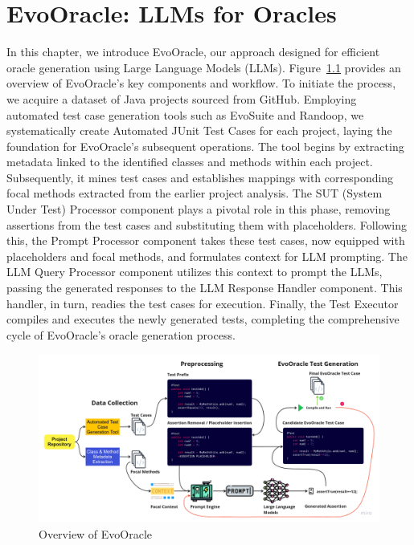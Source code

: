 \chapter{EvoOracle: LLMs for Oracles}
\label{cha:evoOracles}
\vspace{0.4 cm}

In this chapter, we introduce EvoOracle, our approach designed for efficient oracle generation using Large Language Models (LLMs). Figure~\ref{fig:evooracle_overview} provides an overview of EvoOracle's key components and workflow. To initiate the process, we acquire a dataset of Java projects sourced from GitHub. Employing automated test case generation tools such as EvoSuite and Randoop, we systematically create Automated JUnit Test Cases for each project, laying the foundation for EvoOracle's subsequent operations. The tool begins by extracting metadata linked to the identified classes and methods within each project. Subsequently, it mines test cases and establishes mappings with corresponding focal methods extracted from the earlier project analysis. The SUT (System Under Test) Processor component plays a pivotal role in this phase, removing assertions from the test cases and substituting them with placeholders. Following this, the Prompt Processor component takes these test cases, now equipped with placeholders and focal methods, and formulates context for LLM prompting. The LLM Query Processor component utilizes this context to prompt the LLMs, passing the generated responses to the LLM Response Handler component. This handler, in turn, readies the test cases for execution. Finally, the Test Executor compiles and executes the newly generated tests, completing the comprehensive cycle of EvoOracle's oracle generation process.

\begin{figure}[H]
    \centering
    \includegraphics[width=1\linewidth]{images/evooracle_overview.png}
    \caption{Overview of EvoOracle}
    \label{fig:evooracle_overview}
\end{figure}


